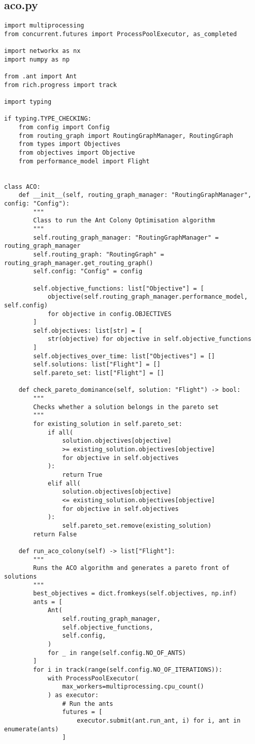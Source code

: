 \subsection{aco.py}
\begin{verbatim}
import multiprocessing
from concurrent.futures import ProcessPoolExecutor, as_completed

import networkx as nx
import numpy as np

from .ant import Ant
from rich.progress import track

import typing

if typing.TYPE_CHECKING:
    from config import Config
    from routing_graph import RoutingGraphManager, RoutingGraph
    from types import Objectives
    from objectives import Objective
    from performance_model import Flight


class ACO:
    def __init__(self, routing_graph_manager: "RoutingGraphManager", config: "Config"):
        """
        Class to run the Ant Colony Optimisation algorithm
        """
        self.routing_graph_manager: "RoutingGraphManager" = routing_graph_manager
        self.routing_graph: "RoutingGraph" = routing_graph_manager.get_routing_graph()
        self.config: "Config" = config

        self.objective_functions: list["Objective"] = [
            objective(self.routing_graph_manager.performance_model, self.config)
            for objective in config.OBJECTIVES
        ]
        self.objectives: list[str] = [
            str(objective) for objective in self.objective_functions
        ]
        self.objectives_over_time: list["Objectives"] = []
        self.solutions: list["Flight"] = []
        self.pareto_set: list["Flight"] = []

    def check_pareto_dominance(self, solution: "Flight") -> bool:
        """
        Checks whether a solution belongs in the pareto set
        """
        for existing_solution in self.pareto_set:
            if all(
                solution.objectives[objective]
                >= existing_solution.objectives[objective]
                for objective in self.objectives
            ):
                return True
            elif all(
                solution.objectives[objective]
                <= existing_solution.objectives[objective]
                for objective in self.objectives
            ):
                self.pareto_set.remove(existing_solution)
        return False

    def run_aco_colony(self) -> list["Flight"]:
        """
        Runs the ACO algorithm and generates a pareto front of solutions
        """
        best_objectives = dict.fromkeys(self.objectives, np.inf)
        ants = [
            Ant(
                self.routing_graph_manager,
                self.objective_functions,
                self.config,
            )
            for _ in range(self.config.NO_OF_ANTS)
        ]
        for i in track(range(self.config.NO_OF_ITERATIONS)):
            with ProcessPoolExecutor(
                max_workers=multiprocessing.cpu_count()
            ) as executor:
                # Run the ants
                futures = [
                    executor.submit(ant.run_ant, i) for i, ant in enumerate(ants)
                ]


\end{verbatim}
